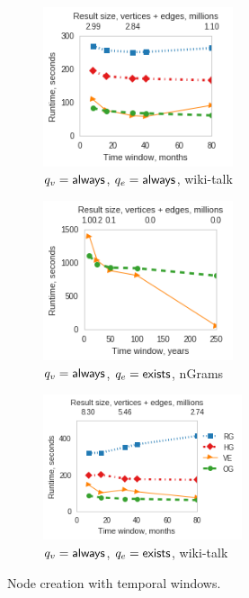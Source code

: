 \begin{figure}[t!]
\centering
\begin{subfigure}{0.3\textwidth}
\includegraphics[width=2.2in]{figs/agg_allall_wikitalk_build13.png}
\caption{$q_v=\textsf{always}$, $q_e=\textsf{always}$, wiki-talk}
\label{fig:agg1}
\end{subfigure}
\begin{subfigure}{0.3\textwidth}
\includegraphics[width=2.2in]{figs/agg_allexists_ngrams_build13.png}
\caption{$q_v=\textsf{always}$, $q_e=\textsf{exists}$, nGrams}
\label{fig:agg2}
\end{subfigure}
\begin{subfigure}{0.35\textwidth}
\includegraphics[width=2.3in]{figs/agg_allexists_wikitalk_build13.png}
\caption{$q_v=\textsf{always}$, $q_e=\textsf{exists}$, wiki-talk}
\label{fig:agg4}
\end{subfigure}
\caption[]{Node creation with temporal windows.}
\vspace{-0.1in}
\label{fig:agg}
\end{figure}

